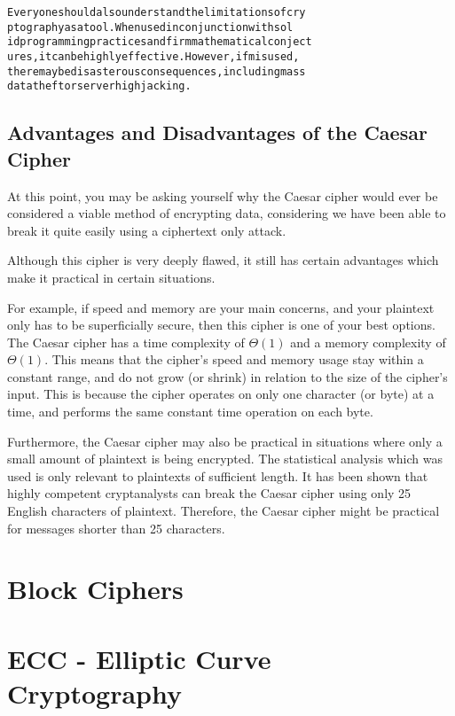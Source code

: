 \documentclass[12pt, a4paper, draft]{report}
\begin{document}
\begin{alltt}
Everyone should also understand the limitations of cry
ptography as a tool. When used in conjunction with sol
id programming practices and firm mathematical conject
ures, it can be highly effective. However, if misused,
there may be disasterous consequences, including mass
data theft or server highjacking.
\end{alltt}

\subsection{Advantages and Disadvantages of the Caesar Cipher}

At this point, you may be asking yourself why the Caesar cipher would
ever be considered a viable method of encrypting data, considering we
have been able to break it quite easily using a ciphertext only attack.

Although this cipher is very deeply flawed, it still has certain
advantages which make it practical in certain situations.

For example, if speed and memory are your main concerns, and your
plaintext only has to be superficially secure, then this cipher is one
of your best options. The Caesar cipher has a time complexity of
$\Theta(1)$ and a memory complexity of $\Theta(1)$. This means that
the cipher's speed and memory usage stay within a constant range, and
do not grow (or shrink) in relation to the size of the cipher's input.
This is because the cipher operates on only one character (or byte) at
a time, and performs the same constant time operation on each byte.

Furthermore, the Caesar cipher may also be practical in situations where
only a small amount of plaintext is being encrypted. The statistical
analysis which was used is only relevant to plaintexts of sufficient
length. It has been shown that highly competent cryptanalysts can break
the Caesar cipher using only 25 English characters of plaintext.
Therefore, the Caesar cipher might be practical for messages shorter than
25 characters.

\section{Block Ciphers}

\section{ECC - Elliptic Curve Cryptography}
\end{document}
